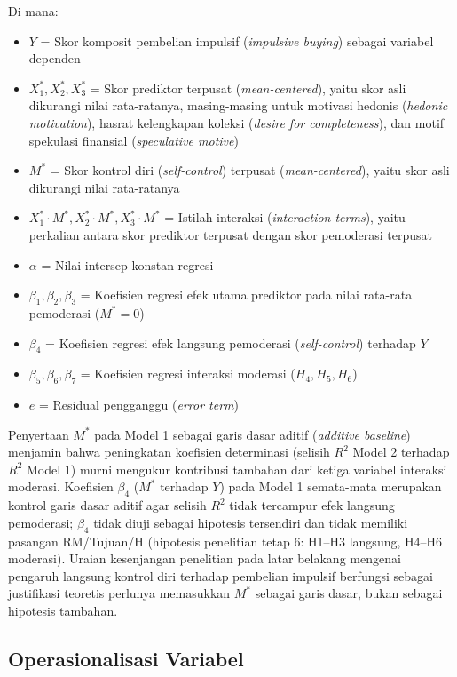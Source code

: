 \documentclass[12pt,a4paper]{article}
\numberwithin{equation}{section}
\numberwithin{table}{section}
\numberwithin{figure}{section}
\begin{document}
\noindent Di mana:
\begin{itemize}
  \item $Y$ = Skor komposit pembelian impulsif (\emph{impulsive buying}) sebagai variabel dependen
  \item $X_1^*, X_2^*, X_3^*$ = Skor prediktor terpusat (\emph{mean-centered}), yaitu skor asli dikurangi nilai rata-ratanya, masing-masing untuk motivasi hedonis (\emph{hedonic motivation}), hasrat kelengkapan koleksi (\emph{desire for completeness}), dan motif spekulasi finansial (\emph{speculative motive})
  \item $M^*$ = Skor kontrol diri (\emph{self-control}) terpusat (\emph{mean-centered}), yaitu skor asli dikurangi nilai rata-ratanya
  \item $X_1^* \cdot M^*, X_2^* \cdot M^*, X_3^* \cdot M^*$ = Istilah interaksi (\emph{interaction terms}), yaitu perkalian antara skor prediktor terpusat dengan skor pemoderasi terpusat
  \item $\alpha$ = Nilai intersep konstan regresi
  \item $\beta_1, \beta_2, \beta_3$ = Koefisien regresi efek utama prediktor pada nilai rata-rata pemoderasi ($M^* = 0$)
  \item $\beta_4$ = Koefisien regresi efek langsung pemoderasi (\emph{self-control}) terhadap $Y$
  \item $\beta_5, \beta_6, \beta_7$ = Koefisien regresi interaksi moderasi ($H_4, H_5, H_6$)
  \item $e$ = Residual pengganggu (\emph{error term})
\end{itemize}

Penyertaan $M^*$ pada Model 1 sebagai garis dasar aditif (\emph{additive baseline}) menjamin bahwa peningkatan koefisien determinasi (selisih $R^2$ Model 2 terhadap $R^2$ Model 1) murni mengukur kontribusi tambahan dari ketiga variabel interaksi moderasi. Koefisien $\beta_4$ ($M^*$ terhadap $Y$) pada Model 1 semata-mata merupakan kontrol garis dasar aditif agar selisih $R^2$ tidak tercampur efek langsung pemoderasi; $\beta_4$ tidak diuji sebagai hipotesis tersendiri dan tidak memiliki pasangan RM/Tujuan/H (hipotesis penelitian tetap 6: H1--H3 langsung, H4--H6 moderasi). Uraian kesenjangan penelitian pada latar belakang mengenai pengaruh langsung kontrol diri terhadap pembelian impulsif berfungsi sebagai justifikasi teoretis perlunya memasukkan $M^*$ sebagai garis dasar, bukan sebagai hipotesis tambahan.

\subsection{Operasionalisasi Variabel}
\end{document}
